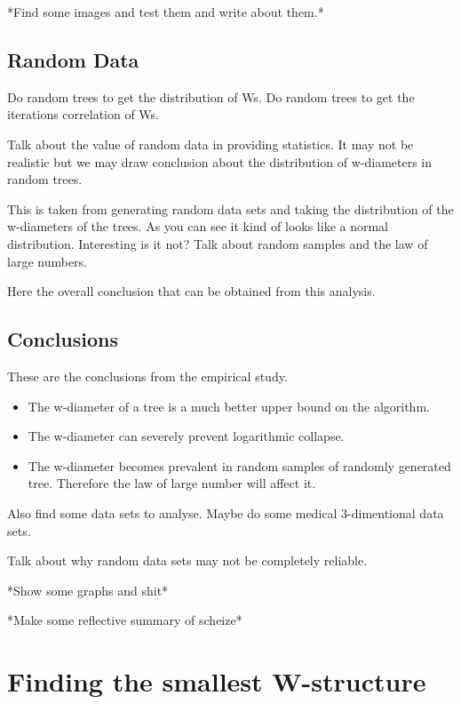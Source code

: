 *Find some images and test them and write about them.*

\subsection{Random Data}

Do random trees to get the distribution of Ws.
Do random trees to get the iterations correlation of Ws.

Talk about the value of random data in providing statistics. It may not be realistic but we may draw conclusion about the distribution of w-diameters in random trees.

This is taken from generating random data sets and taking the distribution of the w-diameters of the trees. As you can see it kind of looks like a normal distribution. Interesting is it not? Talk about random samples and the law of large numbers.

Here the overall conclusion that can be obtained from this analysis.

\subsection{Conclusions}

These are the conclusions from the empirical study.

\begin{itemize}
    \item The w-diameter of a tree is a much better upper bound on the algorithm.
    \item The w-diameter can severely prevent logarithmic collapse.
    \item The w-diameter becomes prevalent in random samples of randomly generated tree. Therefore the law of large number will affect it.
\end{itemize}



Also find some data sets to analyse. Maybe do some medical 3-dimentional data sets.

Talk about why random data sets may not be completely reliable.

*Show some graphs and shit*

*Make some reflective summary of scheize*

\section{Finding the smallest W-structure}

